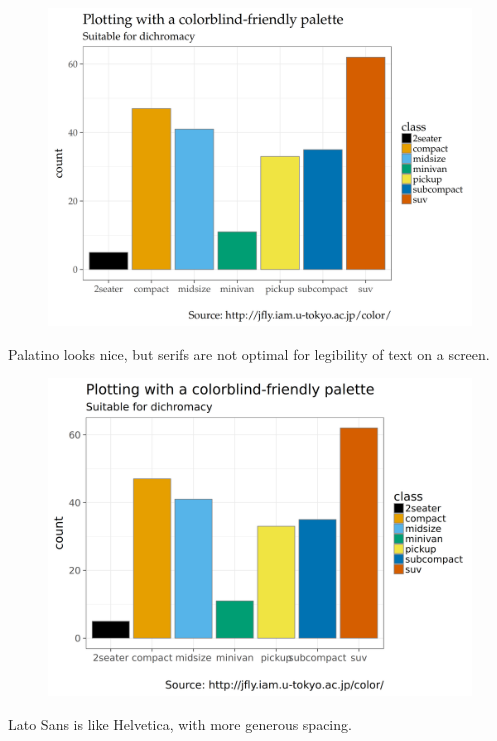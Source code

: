 \begin{frame}
  \begin{figure}[htp!]
    \centering
    \includegraphics[width=0.9\linewidth]{fig/barchart-palatino.png}
  \end{figure}
  
  \small Palatino looks nice, but serifs are not optimal for
  legibility of text on a screen.
  
\end{frame}


\begin{frame}
  \begin{figure}[htp!]
    \centering
    \includegraphics[width=0.9\linewidth]{fig/barchart-latosans.png}
  \end{figure}

  \small Lato Sans is like Helvetica, with more generous spacing.
  
\end{frame}

